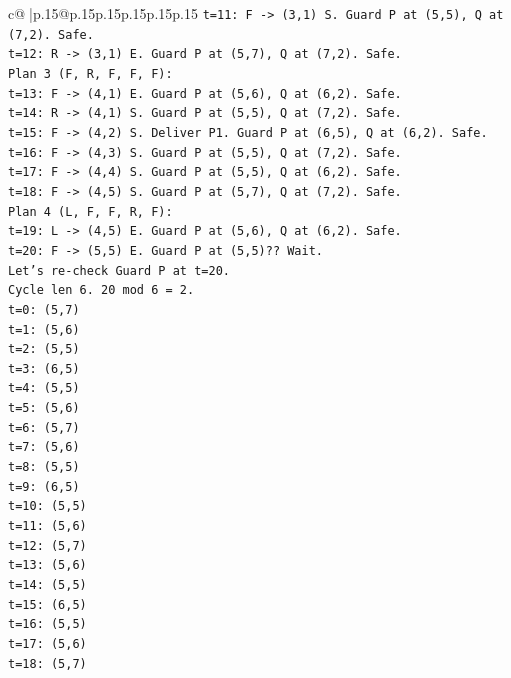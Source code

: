 \documentclass{article}
\begin{document}
{\begin{supertabular}{c@{$\;$}|p{.15\linewidth}@{}p{.15\linewidth}p{.15\linewidth}p{.15\linewidth}p{.15\linewidth}p{.15\linewidth}}
{{{\texttt{t=11: F {-}> (3,1) S. Guard P at (5,5), Q at (7,2). Safe.} \\
\texttt{t=12: R {-}> (3,1) E. Guard P at (5,7), Q at (7,2). Safe.} \\
\texttt{Plan 3 (F, R, F, F, F):} \\
\texttt{t=13: F {-}> (4,1) E. Guard P at (5,6), Q at (6,2). Safe.} \\
\texttt{t=14: R {-}> (4,1) S. Guard P at (5,5), Q at (7,2). Safe.} \\
\texttt{t=15: F {-}> (4,2) S. Deliver P1. Guard P at (6,5), Q at (6,2). Safe.} \\
\texttt{t=16: F {-}> (4,3) S. Guard P at (5,5), Q at (7,2). Safe.} \\
\texttt{t=17: F {-}> (4,4) S. Guard P at (5,5), Q at (6,2). Safe.} \\
\texttt{t=18: F {-}> (4,5) S. Guard P at (5,7), Q at (7,2). Safe.} \\
\texttt{Plan 4 (L, F, F, R, F):} \\
\texttt{t=19: L {-}> (4,5) E. Guard P at (5,6), Q at (6,2). Safe.} \\
\texttt{t=20: F {-}> (5,5) E. Guard P at (5,5)?? Wait.} \\
\texttt{Let's re{-}check Guard P at t=20.} \\
\texttt{Cycle len 6. 20 mod 6 = 2.} \\
\texttt{t=0: (5,7)} \\
\texttt{t=1: (5,6)} \\
\texttt{t=2: (5,5)} \\
\texttt{t=3: (6,5)} \\
\texttt{t=4: (5,5)} \\
\texttt{t=5: (5,6)} \\
\texttt{t=6: (5,7)} \\
\texttt{t=7: (5,6)} \\
\texttt{t=8: (5,5)} \\
\texttt{t=9: (6,5)} \\
\texttt{t=10: (5,5)} \\
\texttt{t=11: (5,6)} \\
\texttt{t=12: (5,7)} \\
\texttt{t=13: (5,6)} \\
\texttt{t=14: (5,5)} \\
\texttt{t=15: (6,5)} \\
\texttt{t=16: (5,5)} \\
\texttt{t=17: (5,6)} \\
\texttt{t=18: (5,7)} \\
}}}
\end{supertabular}}
\end{document}
